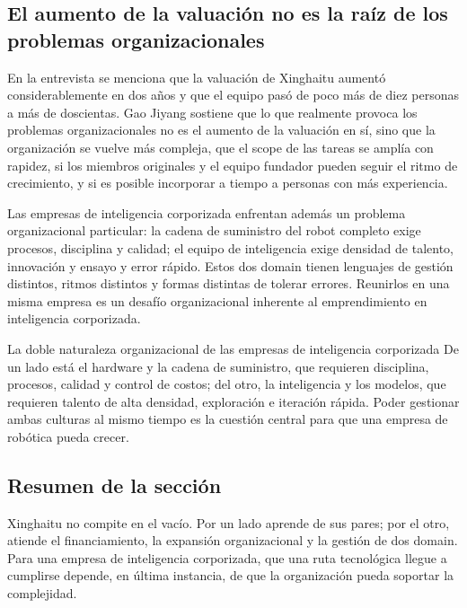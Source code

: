 \subsection{El aumento de la valuación no es la raíz de los problemas organizacionales}

En la entrevista se menciona que la valuación de Xinghaitu aumentó considerablemente en dos años y que el equipo pasó de poco más de diez personas a más de doscientas. Gao Jiyang sostiene que lo que realmente provoca los problemas organizacionales no es el aumento de la valuación en sí, sino que la organización se vuelve más compleja, que el scope de las tareas se amplía con rapidez, si los miembros originales y el equipo fundador pueden seguir el ritmo de crecimiento, y si es posible incorporar a tiempo a personas con más experiencia.

Las empresas de inteligencia corporizada enfrentan además un problema organizacional particular: la cadena de suministro del robot completo exige procesos, disciplina y calidad; el equipo de inteligencia exige densidad de talento, innovación y ensayo y error rápido. Estos dos domain tienen lenguajes de gestión distintos, ritmos distintos y formas distintas de tolerar errores. Reunirlos en una misma empresa es un desafío organizacional inherente al emprendimiento en inteligencia corporizada.

\begin{importantbox}{La doble naturaleza organizacional de las empresas de inteligencia corporizada}
De un lado está el hardware y la cadena de suministro, que requieren disciplina, procesos, calidad y control de costos; del otro, la inteligencia y los modelos, que requieren talento de alta densidad, exploración e iteración rápida. Poder gestionar ambas culturas al mismo tiempo es la cuestión central para que una empresa de robótica pueda crecer.
\end{importantbox}

\subsection{Resumen de la sección}

Xinghaitu no compite en el vacío. Por un lado aprende de sus pares; por el otro, atiende el financiamiento, la expansión organizacional y la gestión de dos domain. Para una empresa de inteligencia corporizada, que una ruta tecnológica llegue a cumplirse depende, en última instancia, de que la organización pueda soportar la complejidad.
